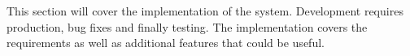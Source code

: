 \documentclass[../main.tex]{subfiles}
\begin{document}
\raggedright
This section will cover the implementation of the system. Development requires production, bug fixes and finally testing. The implementation covers the requirements as well as additional features that could be useful.
\end{document}
